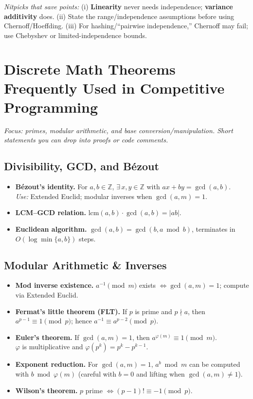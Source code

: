 \documentclass[9pt]{extarticle}
\begin{document}
\smallskip
\noindent\textit{Nitpicks that save points:}
(i) \textbf{Linearity} never needs independence; \textbf{variance additivity} does. 
(ii) State the range/independence assumptions before using Chernoff/Hoeffding. 
(iii) For hashing/“pairwise independence,” Chernoff may fail; use Chebyshev or limited-independence bounds.

\section*{Discrete Math Theorems Frequently Used in Competitive Programming}
\textit{Focus: primes, modular arithmetic, and base conversion/manipulation. Short statements you can drop into proofs or code comments.}

\subsection{Divisibility, GCD, and Bézout}
\begin{itemize}
  \item \textbf{Bézout's identity.} For $a,b\in\mathbb{Z}$, $\exists\,x,y\in\mathbb{Z}$ with $ax+by=\gcd(a,b)$. \\
        \emph{Use:} Extended Euclid; modular inverses when $\gcd(a,m)=1$.
  \item \textbf{LCM--GCD relation.} $\mathrm{lcm}(a,b)\cdot \gcd(a,b)=|ab|$.
  \item \textbf{Euclidean algorithm.} $\gcd(a,b)=\gcd(b,a\bmod b)$, terminates in $O(\log\min\{a,b\})$ steps.
\end{itemize}

\subsection{Modular Arithmetic \& Inverses}
\begin{itemize}
  \item \textbf{Mod inverse existence.} $a^{-1}\pmod m$ exists $\iff \gcd(a,m)=1$; compute via Extended Euclid.
  \item \textbf{Fermat's little theorem (FLT).} If $p$ is prime and $p\nmid a$, then $a^{p-1}\equiv 1\pmod p$; hence $a^{-1}\equiv a^{p-2}\pmod p$.
  \item \textbf{Euler's theorem.} If $\gcd(a,m)=1$, then $a^{\varphi(m)}\equiv 1\pmod m$. \\
        $\varphi$ is multiplicative and $\varphi(p^k)=p^k-p^{k-1}$.
  \item \textbf{Exponent reduction.} For $\gcd(a,m)=1$, $a^b\bmod m$ can be computed with $b\bmod \varphi(m)$ (careful with $b=0$ and lifting when $\gcd(a,m)\ne 1$).
  \item \textbf{Wilson's theorem.} $p$ prime $\iff (p-1)!\equiv -1\pmod p$.
\end{itemize}
\end{document}
